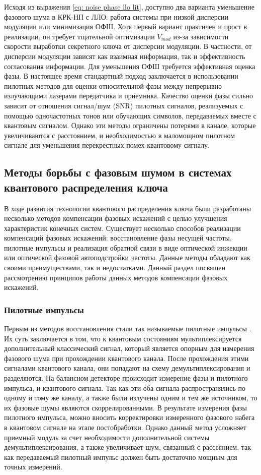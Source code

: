 Исходя из выражения \ref{eq: noise phase llo lit}, доступно два варианта уменьшение фазового шума в КРК-НП с ЛЛО: работа системы при низкой дисперсии модуляции или минимизация ОФШ. Хотя первый вариант практичен и прост в реализации, он требует тщательной оптимизации $V_{mod}$ из-за зависимости скорости выработки секретного ключа от дисперсии модуляции. В частности, от дисперсии модуляции зависят как взаимная информация, так и эффективность согласования информации.
Для уменьшения ОФШ требуется эффективная оценка фазы. В настоящее время стандартный подход заключается в использовании пилотных методов для оценки относительной фазы между непрерывно излучающими лазерами  передатчика и приемника. Качество оценки фазы сильно зависит от отношения сигнал/шум (SNR) пилотных сигналов, реализуемых с помощью одночастотных тонов или обучающих символов, передаваемых вместе с квантовым сигналом. Однако эти методы ограничены потерями в канале, которые увеличиваются с расстоянием, и необходимостью в маломощном пилотном сигнале для уменьшения перекрестных помех квантовому сигналу.

\subsection{Методы борьбы с фазовым шумом в системах квантового распределения ключа}\label{sec:ch1/sect5/subsec1}
В ходе развития технологии квантового распределения ключа были разработаны несколько методов компенсации фазовых искажений с целью улучшения характеристик конечных систем. Существует несколько способов реализации компенсаций фазовых искажений: восстановление фазы несущей частоты, пилотные импульсы и реализация обратной связи в виде оптической инжекции или оптической фазовой автоподстройки частоты. Данные методы обладают как своими преимуществами, так и недостатками. Данный раздел посвящен рассмотрению принципов работы данных методов компенсации фазовых искажений. 
\subsubsection{Пилотные импульсы}Первым из методов восстановления стали так называемые пилотные импульсы \cite{wang2020}. Их суть заключается в том, что к квантовым состояниям мультиплексируется дополнительный классический сигнал, который является опорным для измерения фазового шума при прохождении квантового канала. После прохождения этими сигналами квантового канала, они попадают на схему демультиплексирования и разделяются. На балансном детекторе происходит измерение фазы и пилотного импульса, и квантового сигнала. Так как эти оба сигнала распространялись по одному и тому же каналу, а также были излучены одним и тем же источником, то их фазовые шумы являются скоррелированными. В результате измерения фазы  пилотного импульса, можно вносить корректировки измеренного фазового набега в квантовом сигнале на этапе постобработки. 
\newline Однако данный метод усложняет приемный модуль за счет необходимости дополнительной системы демультиплексирования, а также увеличивает шум, связанный с рассеянием, так как передаваемый  пилотный импульс должен быть достаточно мощным для точных измерений.
